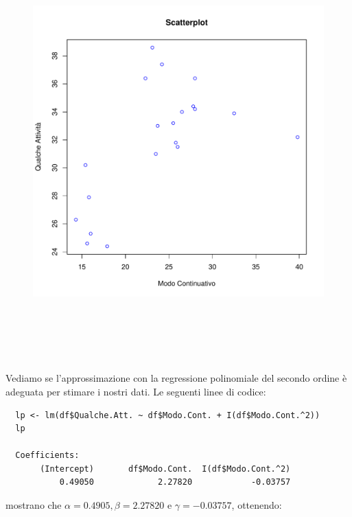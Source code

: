 \vspace{5mm}
\begin{figure}[!htbp]
    \centering
    \includegraphics[height=16cm]{ProgettoSAD/capitoli/images/s_desc_biv/scatterplot_nonlineare.pdf}
\end{figure}
\vspace{5mm}

Vediamo se l'approssimazione con la regressione polinomiale del secondo ordine è adeguata per stimare i nostri dati. Le seguenti linee di codice:

\vspace{5mm}
\begin{lstlisting}
  lp <- lm(df$Qualche.Att. ~ df$Modo.Cont. + I(df$Modo.Cont.^2))
  lp

  Coefficients:
       (Intercept)       df$Modo.Cont.  I(df$Modo.Cont.^2)  
           0.49050             2.27820            -0.03757
\end{lstlisting}
\vspace{5mm}

mostrano che $\alpha = 0.4905, \beta = 2.27820$ e $\gamma = -0.03757$, ottenendo:

